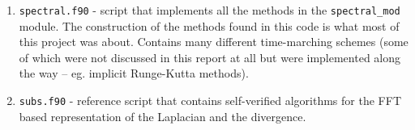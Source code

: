 \documentclass[11pt]{article}
\begin{document}
\begin{enumerate}
\begin{enumerate}
        \item \verb|spectral.f90| - script that implements all the methods in the \verb|spectral_mod| module. The construction of the methods found in this code is what most of this project was about. Contains many different time-marching schemes (some of which were not discussed in this report at all but were implemented along the way -- eg. implicit Runge-Kutta methods).
        \item \verb|subs.f90| - reference script that contains self-verified algorithms for the FFT based representation of the Laplacian and the divergence. 
    \end{enumerate}
\end{enumerate}



    
    
    
\end{document}
